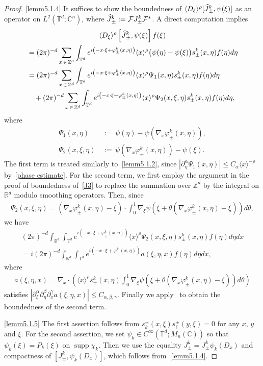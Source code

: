 \documentclass[10pt,a4paper]{amsart}
\renewcommand{\a}{\alpha}
\renewcommand{\b}{\beta}
\newcommand{\g}{\gamma}
\newcommand{\f}{\varphi}
\newcommand{\x}{\xi}
\newcommand{\y}{\eta}
\newcommand{\C}{\mathbb{C}}
\newcommand{\R}{\mathbb{R}}
\newcommand{\Z}{\mathbb{Z}}
\newcommand{\T}{\mathbb{T}}
\newcommand{\FS}{\mathcal{F}}
\newcommand{\la}{\langle}
\newcommand{\ra}{\rangle}
\newcommand{\jap}[1]{\langle #1 \rangle}
\DeclareMathOperator{\supp}{supp}
\let\oldhat\hat
\renewcommand*{\hat}[1]{\mathchoice{\widehat{#1}}{\widehat{#1}}{\oldhat{#1}}{\oldhat{#1}}}
\begin{document}
\begin{proof}
\eqref{lemm5.1.4} It suffices to show the boundedness of $\jap{D_\x}^\rho [\hat{J}_\pm^k, \psi(\x)]$ as an operator on $L^2(\T^d;\C^n)$, where $\hat{J}_\pm^k:=\FS J_\pm^k\FS^*$. A direct computation implies
\begin{multline*}
\la D_\x \ra^\rho \left[\hat{J}_\pm^k, \psi(\x)\right]f(\x) \\
\begin{aligned}
&= (2\pi)^{-d} \sum_{x\,\in\,\Z^d}\int_{\T^d} e^{i\left(-x\cdot\x+\f_\pm^k(x,\y)\right)} \jap{x}^\rho \bigl(\psi(\y)-\psi(\x)\bigr) s_\pm^k(x,\y) f(\y) d\y \\
&= (2\pi)^{-d} \sum_{x\,\in\,\Z^d}\int_{\T^d} e^{i\left(-x\cdot\x+\f_\pm^k(x,\y)\right)} \jap{x}^\rho \Psi_1(x,\y) s_\pm^k(x,\y) f(\y) d\y  \\
&\quad + (2\pi)^{-d} \sum_{x\,\in\,\Z^d}\int_{\T^d} e^{i\left(-x\cdot\x+\f_\pm^k(x,\y)\right)} \jap{x}^\rho \Psi_2(x,\x,\y) s_\pm^k(x,\y) f(\y) d\y, 
\end{aligned}
\end{multline*}
where
\begin{align*}
\Psi_1(x,\y)\, &{:=}\,  \psi(\y)-\psi\left(\nabla_x\f_\pm^k(x,\y)\right), \\
\Psi_2(x,\x,\y)\, &{:=}\,  \psi\left(\nabla_x\f_\pm^k(x,\y)\right)-\psi(\x).
\end{align*}
The first term is treated similarly to~\eqref{lemm5.1.2}, since $|\partial_\y^\a \Psi_1(x,\y)| \leq C_\a \jap{x}^{-\rho}$ by~\eqref{phase estimate}. For the second term, we first employ the argument in the proof of boundedness of~\eqref{J3} to replace the summation over $\Z^d$ by the integral on $\R^d$ modulo smoothing operators. Then, since
\begin{align*}
\Psi_2(x,\x,\y) = \left(\nabla_x\f_\pm^k(x,\y)-\x\right)\cdot\int_0^1 \nabla_\x \psi\left(\x+\theta\left(\nabla_x\f_\pm^k(x,\y)-\x\right)\right) d\theta,
\end{align*}
we have
\begin{multline*}
(2\pi)^{-d} \int_{\R^d}\int_{\T^d} e^{i\left(-x\cdot\x+\f_\pm^k(x,\y)\right)} \jap{x}^\rho \Psi_2(x,\x,\y) s_\pm^k(x,\y) f(\eta) d\eta dx \\
= i(2\pi)^{-d} \int_{\R^d}\int_{\T^d} e^{i\left(-x\cdot\x+\f_\pm^k(x,\y)\right)} a(\x,\y,x) f(\y) d\y dx,
\end{multline*}
where
\begin{align*}
a(\x,\y,x)=\nabla_x \cdot \left(\jap{x}^\rho s_\pm^k(x,\y) \int_0^1 \nabla_\x\psi\left(\x+\theta\left(\nabla_x\f_\pm^k(x,\y)-\x\right)\right) d\theta \right)
\end{align*}
satisfies $|\partial_\x^\a\partial_\y^\b\partial_x^\g a(\x,\y,x)|\leq C_{\a,\b,\g}$. Finally we apply~\cite[Theorem~2.1]{As-F} to obtain the boundedness of the second term.

\eqref{lemm5.1.5} The first assertion follows from $s_k^\pm(x,\x)s_\ell^\pm(y,\x)=0$ for any $x$, $y$ and $\x$. For the second assertion, we set $\psi_k\in C^\infty(\T^d;M_n(\C))$ so that $\psi_k(\x)=P_k(\x)$ on $\supp \chi_k$. Then we use the equality $J_\pm^k=J_\pm^k \psi_k(D_x)$ and compactness of $[J_\pm^k,\psi_k(D_x)]$, which follows from~\eqref{lemm5.1.4}.
\end{proof}
\end{document}
